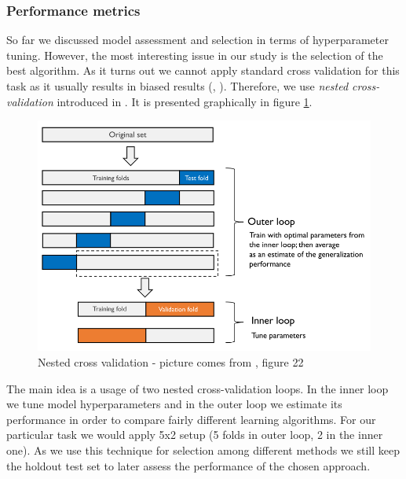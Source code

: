 \documentclass[shortabstract, english, mgr]{iithesis}
\begin{document}
\subsubsection{Performance metrics}

So far we discussed model assessment and selection in terms of hyperparameter tuning. However, the most interesting issue in our study is the selection of the best algorithm. As it turns out we cannot apply standard cross validation for this task as it usually results in biased results (\cite{ModelSelection}, \cite{cvOverfit}). Therefore, we use \textit{nested cross-validation} introduced in \cite{nestedCV}. It is presented graphically in figure \ref{fig:nestedCV}.

\begin{figure}
\centering
\includegraphics[width=\textwidth]{images/nestedCV.png}
\caption{Nested cross validation - picture comes from \cite{ModelSelection}, figure 22}
\label{fig:nestedCV}
\end{figure}

The main idea is a usage of two nested cross-validation loops. In the inner loop we tune model hyperparameters and in the outer loop we estimate its performance in order to compare fairly different learning algorithms. For our particular task we would apply 5x2 setup (5 folds in outer loop, 2 in the inner one). As we use this technique for selection among different methods we still keep the holdout test set to later assess the performance of the chosen approach.
\end{document}
